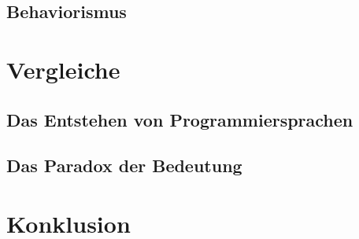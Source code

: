 \documentclass[a4paper,12pt]{article}
\begin{document}
\subsection{Behaviorismus}
\blindtext[1]


\section{Vergleiche}
\blindtext[1]

\subsection{Das Entstehen von Programmiersprachen}
\blindtext[1]

\subsection{Das Paradox der Bedeutung}
\blindtext[1]

\section{Konklusion}
\blindtext[1]
\end{document}
